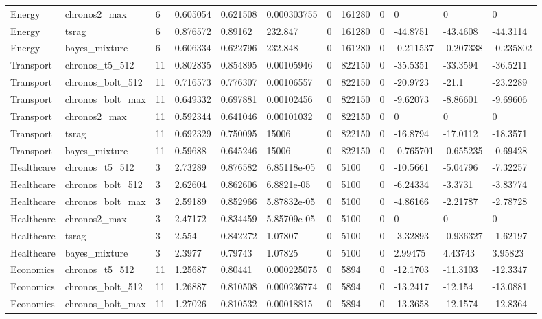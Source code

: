 \begin{tabular}{llllllllllll}
Energy & chronos2\_max & 6 & 0.605054 & 0.621508 & 0.000303755 & 0 & 161280 & 0 & 0 & 0 & 0 \\
Energy & tsrag & 6 & 0.876572 & 0.89162 & 232.847 & 0 & 161280 & 0 & -44.8751 & -43.4608 & -44.3114 \\
Energy & bayes\_mixture & 6 & 0.606334 & 0.622796 & 232.848 & 0 & 161280 & 0 & -0.211537 & -0.207338 & -0.235802 \\
Transport & chronos\_t5\_512 & 11 & 0.802835 & 0.854895 & 0.00105946 & 0 & 822150 & 0 & -35.5351 & -33.3594 & -36.5211 \\
Transport & chronos\_bolt\_512 & 11 & 0.716573 & 0.776307 & 0.00106557 & 0 & 822150 & 0 & -20.9723 & -21.1 & -23.2289 \\
Transport & chronos\_bolt\_max & 11 & 0.649332 & 0.697881 & 0.00102456 & 0 & 822150 & 0 & -9.62073 & -8.86601 & -9.69606 \\
Transport & chronos2\_max & 11 & 0.592344 & 0.641046 & 0.00101032 & 0 & 822150 & 0 & 0 & 0 & 0 \\
Transport & tsrag & 11 & 0.692329 & 0.750095 & 15006 & 0 & 822150 & 0 & -16.8794 & -17.0112 & -18.3571 \\
Transport & bayes\_mixture & 11 & 0.59688 & 0.645246 & 15006 & 0 & 822150 & 0 & -0.765701 & -0.655235 & -0.69428 \\
Healthcare & chronos\_t5\_512 & 3 & 2.73289 & 0.876582 & 6.85118e-05 & 0 & 5100 & 0 & -10.5661 & -5.04796 & -7.32257 \\
Healthcare & chronos\_bolt\_512 & 3 & 2.62604 & 0.862606 & 6.8821e-05 & 0 & 5100 & 0 & -6.24334 & -3.3731 & -3.83774 \\
Healthcare & chronos\_bolt\_max & 3 & 2.59189 & 0.852966 & 5.87832e-05 & 0 & 5100 & 0 & -4.86166 & -2.21787 & -2.78728 \\
Healthcare & chronos2\_max & 3 & 2.47172 & 0.834459 & 5.85709e-05 & 0 & 5100 & 0 & 0 & 0 & 0 \\
Healthcare & tsrag & 3 & 2.554 & 0.842272 & 1.07807 & 0 & 5100 & 0 & -3.32893 & -0.936327 & -1.62197 \\
Healthcare & bayes\_mixture & 3 & 2.3977 & 0.79743 & 1.07825 & 0 & 5100 & 0 & 2.99475 & 4.43743 & 3.95823 \\
Economics & chronos\_t5\_512 & 11 & 1.25687 & 0.80441 & 0.000225075 & 0 & 5894 & 0 & -12.1703 & -11.3103 & -12.3347 \\
Economics & chronos\_bolt\_512 & 11 & 1.26887 & 0.810508 & 0.000236774 & 0 & 5894 & 0 & -13.2417 & -12.154 & -13.0881 \\
Economics & chronos\_bolt\_max & 11 & 1.27026 & 0.810532 & 0.00018815 & 0 & 5894 & 0 & -13.3658 & -12.1574 & -12.8364 \\

\end{tabular}

